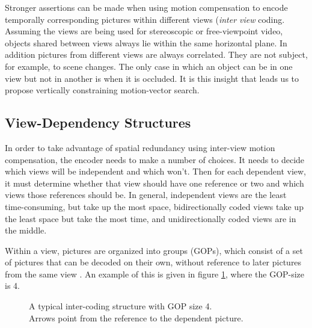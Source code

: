 \documentclass[twoside, 11pt]{article}
\begin{document}
Stronger assertions can be made when using motion compensation to encode
temporally corresponding pictures within different views ({\it inter view}
coding. Assuming the views are being used for stereoscopic or free-viewpoint
video, objects shared between views always lie within the same horizontal plane.
In addition pictures from different views are always correlated. They are not
subject, for example, to scene changes. The only case in which an object can be
in one view but not in another is when it is occluded. It is this insight that
leads us to propose vertically constraining motion-vector search.

\subsection{View-Dependency Structures}
\label{subsec:depends}
In order to take advantage of spatial redundancy using inter-view motion
compensation, the encoder needs to make a number of choices. It needs to decide
which views will be independent and which won't. Then for each dependent view,
it must determine whether that view should have one reference or two and which
views those references should be. In general, independent views are the least
time-consuming, but take up the most space, bidirectionally coded views take up
the least space but take the most time, and unidirectionally coded views are in
the middle.

Within a view, pictures are organized into groups (GOPs), which consist of a set
of pictures that can be decoded on their own, without reference to later
pictures from the same view \cite{vet11}. An example of this is given in figure
\ref{fig:inter}, where the GOP-size is 4.

\begin{figure}[H]
\begin{center}
\end{center}
\caption{
A typical inter-coding structure with GOP size 4. \\
Arrows point from the reference to the dependent picture.
}
\label{fig:inter}
\end{figure}
\end{document}
